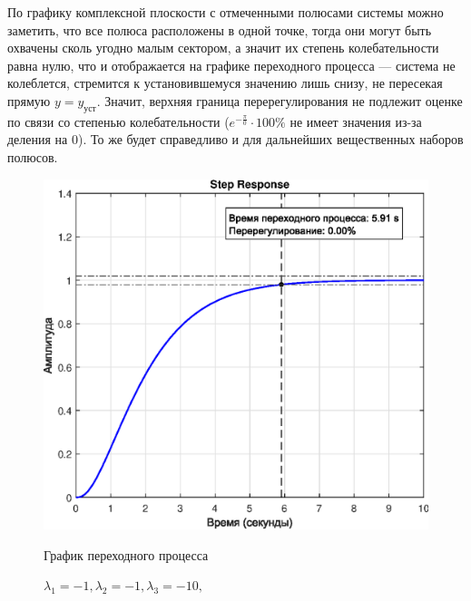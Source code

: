 \documentclass[a4paper]{article}
\begin{document}
По графику комплексной плоскости с отмеченными полюсами системы можно заметить, что все полюса расположены в одной точке, тогда они могут быть охвачены сколь угодно малым сектором, а значит их степень колебательности равна нулю, что и отображается на графике переходного процесса --- система не колеблется, стремится к установившемуся значению лишь снизу, не пересекая прямую $y = y_{\text{уст}}$. Значит, верхняя граница перерегулирования не подлежит оценке по связи со степенью колебательности ($e^{-\frac{\pi}{0}}\cdot 100\%$ не имеет значения из-за деления на 0). То же будет справедливо и для дальнейших вещественных наборов полюсов.

\begin{figure}[H]
    \begin{minipage}{0.5\textwidth}
        \centering \includegraphics[width=\textwidth]{ex2/-1_-1_-10.eps}
        \caption{$\lambda_1=-1, \lambda_2=-1, \lambda_3=-10,$}
        \centerline{График переходного процесса}
    \end{minipage}\hfill
    \begin{minipage}{0.5\textwidth}

\end{minipage}
\end{figure}
\end{document}
